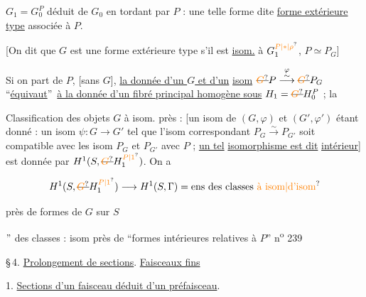 
\(G_1=G_0^P\) déduit de \(G_0\) en tordant par \(P\)\inserted{ [pour l'instant, \unsure{par hypoth.|par not.} \(P=P_G\)]} : une telle  forme  dite \uline{forme extérieure type} associée à \(P\).

[On dit que \(G\) est une forme extérieure type s'il est \uline{isom.} à \(G_{1}^{\unsure{P|*|\rho}}\),    \(P\simeq P_G\)]

Si on part de \(P\), [sans \(G\)], \uline{la donnée d'un \(G\) et d'un} \uline{isom} \(\deleted{\unsure{G}}P\mathrel{\overset{\varphi}{\overset{\sim}{\longrightarrow}}}\deleted{\unsure{G}}P_G\) \textquotedblleft\uline{équivaut}\textquotedblright\ \uline{à la donnée d'un fibré principal homogène sous} \(H_1=\deleted{\unsure{G}}H_0^P\) ; la


Classification des objets \(G\) à isom. près : [un isom de \((G,\varphi)\) et \((G',\varphi')\) étant donné : un isom \(\psi:G\to G'\) tel que l'isom correspondant \(P_G\xrightarrow{\sim}P_{G'}\) soit compatible avec les isom \(P_G\) et \(P_{G'}\) avec \(P\)  ; \uline{un tel}  \uline{isomorphisme est dit} \uline{intérieur}]   est donnée par \(H^1(S,\deleted{\unsure{G}}H_{1}^{\unsure{P|1}})\). On a


\[
H^1(S,\deleted{\unsure{G}}H_1^{\unsure{P|1}})\longrightarrow H^1(S,\Gamma)=\text{ens des classes \unsure{à isom|d'isom}}
\]

près de formes de \(G\) sur \(S\)

\(\text{\textquotedblright}\)  des classes : isom près de \textquotedblleft formes  intérieures relatives à \(P\)\textquotedblright
{}
n\textsuperscript{o} 239

\S\,4. \uline{Prolongement de sections}. \uline{Faisceaux fins}

1. \uline{Sections d'un faisceau déduit d'un préfaisceau}.

